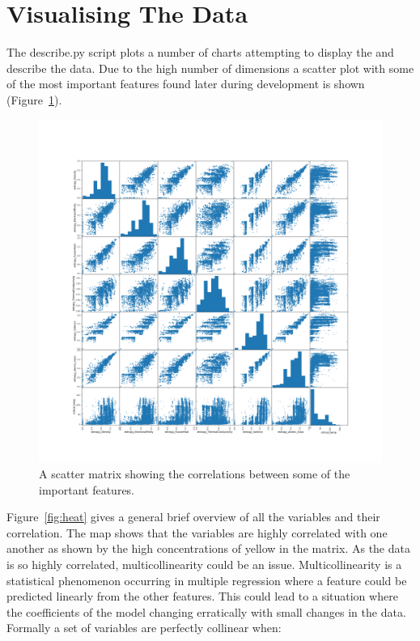 \documentclass{article}
\begin{document}
\section{Visualising The Data} The describe.py script plots a number of charts attempting to display the and describe the data. Due to the high number of dimensions a scatter plot with some of the most important features found later during development is shown (Figure~\ref{fig:scatter}).

\begin{figure}[H]
\label{fig:scatter}
  \centering
    \includegraphics[scale=0.2]{images/scattermatrix.png}
    \caption{A scatter matrix showing the correlations between some of the important features.}
\end{figure}
Figure~\ref{fig:heat} gives a general brief overview of all the variables and their correlation. The map shows that the variables are highly correlated with one another as shown by the high concentrations of yellow in the matrix. As the data is so highly correlated, multicollinearity could be an issue. Multicollinearity is a statistical phenomenon occurring in multiple regression where a feature could be predicted linearly from the other features. This could lead to a situation where the coefficients of the model changing erratically with small changes in the data. Formally a set of variables are perfectly collinear when:
\end{document}
